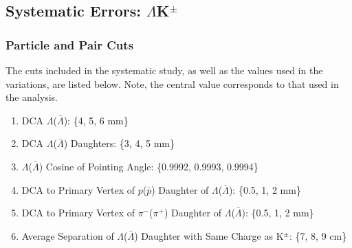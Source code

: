 \documentclass[../AnalysisNoteJBuxton.tex]{subfiles}
\begin{document}
\subsection{Systematic Errors: \texorpdfstring{$\Lambda$K$^{\pm}$}{TEXT}}
\label{SysErrsLamKch}

\subsubsection{Particle and Pair Cuts}
\label{SysErrsLamKch:ParticleAndPairCuts}

The cuts included in the systematic study, as well as the values used in the variations, are listed below.  Note, the central value corresponds to that used in the analysis.

\begin{enumerate}
 \item DCA $\Lambda$($\bar{\Lambda}$): \{4, 5, 6 mm\}
 \item DCA $\Lambda$($\bar{\Lambda}$) Daughters: \{3, 4, 5 mm\}
 \item $\Lambda$($\bar{\Lambda}$) Cosine of Pointing Angle: \{0.9992, 0.9993, 0.9994\}
 \item DCA to Primary Vertex of $p$($\bar{p}$) Daughter of $\Lambda$($\bar{\Lambda}$):  \{0.5, 1, 2 mm\}
 \item DCA to Primary Vertex of $\pi^{-}$($\pi^{+}$) Daughter of $\Lambda$($\bar{\Lambda}$):  \{0.5, 1, 2 mm\} 
 \item Average Separation of $\Lambda$($\bar{\Lambda}$) Daughter with Same Charge as K$^{\pm}$: \{7, 8, 9 cm\}
\end{enumerate}
\end{document}
